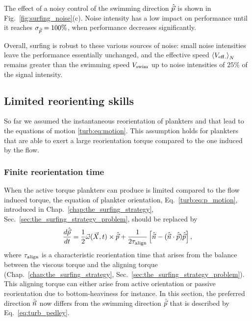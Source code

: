 The effect of a noisy control of the swimming direction $\hat{\vec{p}}$ is shown in Fig.~\ref{fig:surfing_noise}(c).
Noise intensity has a low impact on performance until it reaches $\sigma_{\hat{\vec{p}}} = 100\%$, when performance decreases significantly.

Overall, surfing is robust to these various sources of noise: small noise intensities leave the performance essentially unchanged, and the effective speed $\left\langle V_{\mathrm{eff.}} \right\rangle_N$ remains greater than the swimming speed $V_{\mathrm{swim}}$ up to noise intensities of $25\%$ of the signal intensity.

\subsection{Limited reorienting skills}\label{sec:surfing_on_turbulence_rtime}

So far we assumed the instantaneous reorientation of plankters and that lead to the equations of motion \eqref{turb:eq:motion}.
This assumption holds for plankters that are able to exert a large reorientation torque compared to the one induced by the flow.

\subsubsection{Finite reorientation time}

When the active torque plankters can produce is limited compared to the flow induced torque, the equation of plankter orientation, Eq.~\eqref{turb:eq:p_motion}, introduced in Chap.~\ref{chap:the_surfing_strategy}, Sec.~\ref{sec:the_surfing_strategy_problem}, should be replaced by \citep{Pedley1992}
\begin{equation}\label{eq:turb_pedley}
		\frac{d \hat{\vec{p}}}{d t}  =
		\frac{1}{2} \vec{\omega} (\vec{X}, t) \times \hat{\vec{p}} + \frac{1}{2 \tau_{\mathrm{align}}} \left[ \hat{\vec{n}} - (\hat{\vec{n}} \cdot \hat{\vec{p}}) \hat{\vec{p}} \right],
\end{equation}
where $\tau_{\mathrm{align}}$ is a characteristic reorientation time that arises from the balance between the viscous torque and the aligning torque (Chap.~\ref{chap:the_surfing_strategy}, Sec.~\ref{sec:the_surfing_strategy_problem}).
This aligning torque can either arise from active orientation or passive reorientation due to bottom-heaviness for instance.
In this section, the preferred direction $\hat{\vec{n}}$ now differs from the swimming direction $\hat{\vec{p}}$ that is described by Eq.~\eqref{eq:turb_pedley}.

